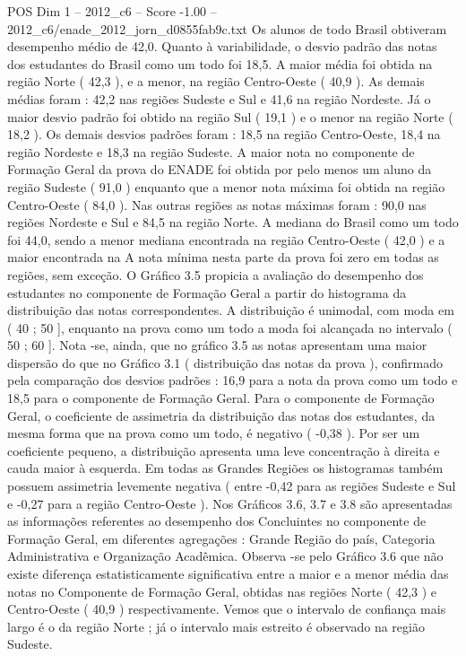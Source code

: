 \begin{textsample}{POS Dim 1 – 2012\_c6 – Score -1.00 – 2012\_c6/enade\_2012\_jorn\_d0855fab9c.txt}
Os alunos de todo Brasil obtiveram desempenho médio de 42,0.
Quanto à variabilidade, o desvio padrão das notas dos estudantes do Brasil como um todo foi 18,5.
A maior média foi obtida na região Norte ( 42,3 ), e a menor, na região Centro-Oeste ( 40,9 ).
As demais médias foram : 42,2 nas regiões Sudeste e Sul e 41,6 na região Nordeste.
Já o maior desvio padrão foi obtido na região Sul ( 19,1 ) e o menor na região Norte ( 18,2 ).
Os demais desvios padrões foram : 18,5 na região Centro-Oeste, 18,4 na região Nordeste e 18,3 na região Sudeste.
A maior nota no componente de Formação Geral da prova do ENADE foi obtida por pelo menos um aluno da região Sudeste ( 91,0 ) enquanto que a menor nota máxima foi obtida na região Centro-Oeste ( 84,0 ).
Nas outras regiões as notas máximas foram : 90,0 nas regiões Nordeste e Sul e 84,5 na região Norte.
A mediana do Brasil como um todo foi 44,0, sendo a menor mediana encontrada na região Centro-Oeste ( 42,0 ) e a maior encontrada na A nota mínima nesta parte da prova foi zero em todas as regiões, sem exceção.
O Gráfico 3.5 propicia a avaliação do desempenho dos estudantes no componente de Formação Geral a partir do histograma da distribuição das notas correspondentes.
A distribuição é unimodal, com moda em ( 40 ; 50 ], enquanto na prova como um todo a moda foi alcançada no intervalo ( 50 ; 60 ].
Nota -se, ainda, que no gráfico 3.5 as notas apresentam uma maior dispersão do que no Gráfico 3.1 ( distribuição das notas da prova ), confirmado pela comparação dos desvios padrões : 16,9 para a nota da prova como um todo e 18,5 para o componente de Formação Geral.
Para o componente de Formação Geral, o coeficiente de assimetria da distribuição das notas dos estudantes, da mesma forma que na prova como um todo, é negativo ( -0,38 ).
Por ser um coeficiente pequeno, a distribuição apresenta uma leve concentração à direita e cauda maior à esquerda.
Em todas as Grandes Regiões os histogramas também possuem assimetria levemente negativa ( entre -0,42 para as regiões Sudeste e Sul e -0,27 para a região Centro-Oeste ).
Nos Gráficos 3.6, 3.7 e 3.8 são apresentadas as informações referentes ao desempenho dos Concluintes no componente de Formação Geral, em diferentes agregações : Grande Região do país, Categoria Administrativa e Organização Acadêmica.
Observa -se pelo Gráfico 3.6 que não existe diferença estatisticamente significativa entre a maior e a menor média das notas no Componente de Formação Geral, obtidas nas regiões Norte ( 42,3 ) e Centro-Oeste ( 40,9 ) respectivamente.
Vemos que o intervalo de confiança mais largo é o da região Norte ; já o intervalo mais estreito é observado na região Sudeste.

\end{textsample}
